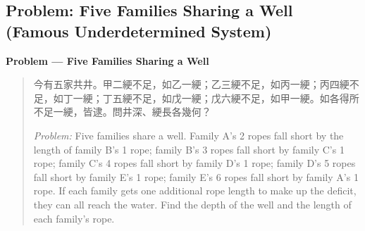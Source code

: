\documentclass[11pt,a4paper]{article}
\newcommand{\zh}[1]{{#1}}
\newenvironment{chproblem}[1][]{%
  \par\medskip\noindent\textbf{\textcolor{sectioncolor}{#1}}\par\nopagebreak
  \begin{quote}\small
}{%
  \end{quote}\medskip
}
\begin{document}
\subsection{Problem: Five Families Sharing a Well (Famous Underdetermined System)}

\begin{chproblem}[Problem --- Five Families Sharing a Well]
\zh{今有五家共井。甲二綆不足，如乙一綆；乙三綆不足，如丙一綆；丙四綆不足，如丁一綆；丁五綆不足，如戊一綆；戊六綆不足，如甲一綆。如各得所不足一綆，皆逮。問井深、綆長各幾何？}

\medskip
\textit{Problem:} Five families share a well. Family A's 2 ropes fall short by
the length of family B's 1 rope; family B's 3 ropes fall short by family C's
1 rope; family C's 4 ropes fall short by family D's 1 rope; family D's 5
ropes fall short by family E's 1 rope; family E's 6 ropes fall short by
family A's 1 rope. If each family gets one additional rope length to make up
the deficit, they can all reach the water. Find the depth of the well and the
length of each family's rope.
\end{chproblem}
\end{document}
